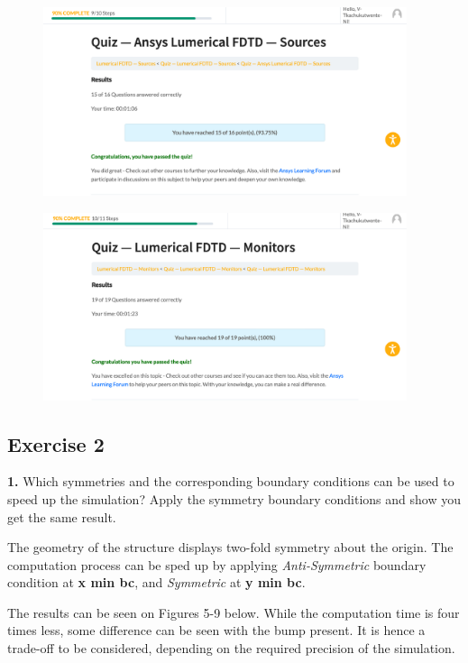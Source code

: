 \documentclass[11pt,a4paper]{article}
\begin{document}
\begin{figure}[ht]
        \includegraphics[width=0.95\textwidth]{lu1.png}
\end{figure}

\begin{figure}[ht]
        \includegraphics[width=0.95\textwidth]{lu2.png}
\end{figure}

\subsection*{Exercise 2}
\begin{displayquote}
    \textbf{1. }Which symmetries and the corresponding boundary conditions can be used to speed up the simulation? Apply the symmetry boundary conditions and show you get the same result.
\end{displayquote}

The geometry of the structure displays two-fold symmetry about the origin. The computation process can be sped up by applying\textit{ Anti-Symmetric} boundary condition at \textbf{x min bc}, and \textit{Symmetric} at \textbf{y min bc}. 

The results can be seen on Figures 5-9 below. While the computation time is four times less, some difference can be seen with the bump present. It is hence a trade-off to be considered, depending on the required precision of the simulation. 
\end{document}
